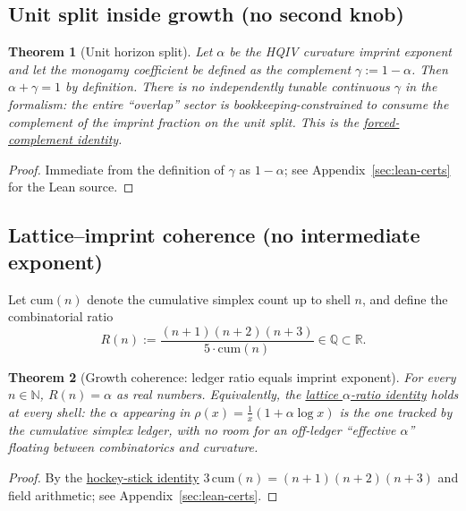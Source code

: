 \documentclass[11pt]{amsart}
\newtheorem{theorem}{Theorem}[section]
\begin{document}
\subsection{Unit split inside growth (no second knob)}

\begin{theorem}[Unit horizon split]
\label{thm:unit-split}
Let \(\alpha\) be the HQIV curvature imprint exponent and let the monogamy coefficient be defined as the complement \(\gamma:=1-\alpha\). Then \(\alpha+\gamma=1\) by definition. There is no independently tunable continuous \(\gamma\) in the formalism: the entire ``overlap'' sector is bookkeeping-constrained to consume the complement of the imprint fraction on the unit split. This is the \hyperref[lean:gamma-complement]{forced-complement identity}.
\end{theorem}

\begin{proof}
Immediate from the definition of \(\gamma\) as \(1-\alpha\); see Appendix~\ref{sec:lean-certs} for the Lean source.
\end{proof}

\subsection{Lattice--imprint coherence (no intermediate exponent)}

Let \(\mathrm{cum}(n)\) denote the cumulative simplex count up to shell \(n\), and define the combinatorial ratio
\[
R(n):=\frac{(n+1)(n+2)(n+3)}{5\cdot \mathrm{cum}(n)}\in\mathbb{Q}\subset\mathbb{R}.
\]

\begin{theorem}[Growth coherence: ledger ratio equals imprint exponent]
\label{thm:growth-coherence}
For every \(n\in\mathbb{N}\), \(R(n)=\alpha\) as real numbers. Equivalently, the \hyperref[lean:lattice-ratio]{lattice \(\alpha\)-ratio identity} holds at every shell: the \(\alpha\) appearing in \(\rho(x)=\frac1x(1+\alpha\log x)\) is the one tracked by the cumulative simplex ledger, with no room for an off-ledger ``effective \(\alpha\)'' floating between combinatorics and curvature.
\end{theorem}

\begin{proof}
By the \hyperref[lean:hockey-stick]{hockey-stick identity} \(3\,\mathrm{cum}(n)=(n+1)(n+2)(n+3)\) and field arithmetic; see Appendix~\ref{sec:lean-certs}.
\end{proof}
\end{document}
